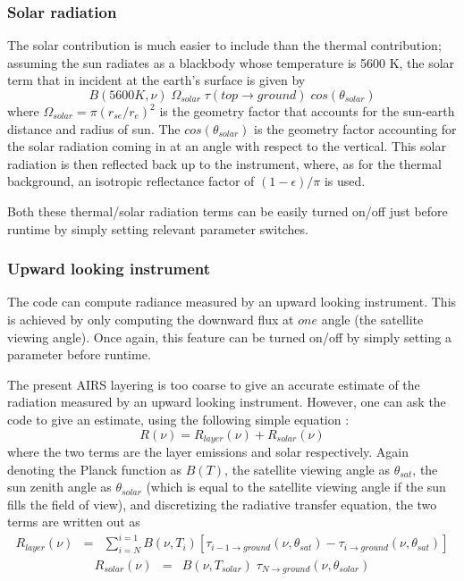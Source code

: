 \documentclass[12pt]{article}
\begin{document}
{{{{\subsubsection{Solar radiation}
The solar contribution is much easier to include than the thermal 
contribution; assuming the sun radiates as a blackbody whose temperature is
5600 K, the solar term that in incident at the earth's surface is given by 
\begin{equation}
   B(5600 K,\nu) \; \Omega_{solar} \; \tau(top \rightarrow ground)  \;
   cos(\theta_{solar})
\end{equation}
where $\Omega_{solar} = \pi(r_{se}/r_{e})^{2}$ is the geometry factor that 
accounts for the sun-earth distance and radius of sun.  The 
$cos(\theta_{solar})$ is the 
geometry factor accounting for the solar radiation coming in at an angle
with respect to the vertical.  This solar radiation is then reflected back
up to the instrument, where, as for the thermal background, 
an isotropic reflectance factor of $(1-\epsilon)/\pi$ is used.

Both these thermal/solar radiation terms can be easily turned on/off just 
before runtime by simply setting relevant parameter switches. 

\subsubsection{Upward looking instrument}

The code can compute radiance measured by an upward looking
instrument.  This is achieved by only computing the downward flux at
$one$ angle (the satellite viewing angle).  Once again, this feature
can be turned on/off by simply setting a parameter before runtime.

The present AIRS layering is too coarse to give an accurate estimate
of the radiation measured by an upward looking instrument.  However,
one can ask the code to give an estimate, using the following simple
equation :
\begin{equation}
R(\nu) = R_{layer}(\nu) + R_{solar}(\nu)
\end{equation}
where the two terms are the layer emissions and solar respectively.
Again denoting the Planck function as $B(T)$, the satellite viewing
angle as $\theta_{sat}$, the sun zenith angle as $\theta_{solar}$
(which is equal to the satellite viewing angle if the sun fills the
field of view), and discretizing the radiative transfer equation, the
two terms are written out as
\begin{eqnarray*}
R_{layer}(\nu) & = & \sum_{i=N}^{i=1} B(\nu,T_{i})
 \left[ \tau_{i-1 \rightarrow ground}(\nu,\theta_{sat})-
 \tau_{i \rightarrow ground}(\nu,\theta_{sat}) \right]
\end{eqnarray*}
\begin{eqnarray*}
R_{solar}(\nu) & = & B(\nu,T_{solar}) \;
              \tau_{N \rightarrow ground}(\nu,\theta_{solar})
\end{eqnarray*}

}}}}
\end{document}
